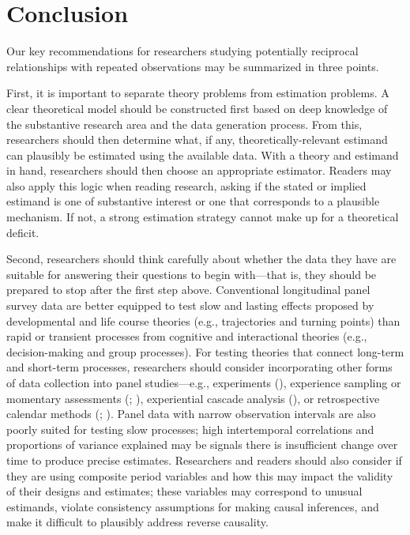 \documentclass[
  letterpaper,
  DIV=11,
  numbers=noendperiod]{scrartcl}
\begin{document}
\section{Conclusion}\label{conclusion}

Our key recommendations for researchers studying potentially reciprocal
relationships with repeated observations may be summarized in three
points.

First, it is important to separate theory problems from estimation
problems. A clear theoretical model should be constructed first based on
deep knowledge of the substantive research area and the data generation
process. From this, researchers should then determine what, if any,
theoretically-relevant estimand can plausibly be estimated using the
available data. With a theory and estimand in hand, researchers should
then choose an appropriate estimator. Readers may also apply this logic
when reading research, asking if the stated or implied estimand is one
of substantive interest or one that corresponds to a plausible
mechanism. If not, a strong estimation strategy cannot make up for a
theoretical deficit.

Second, researchers should think carefully about whether the data they
have are suitable for answering their questions to begin with---that is,
they should be prepared to stop after the first step above. Conventional
longitudinal panel survey data are better equipped to test slow and
lasting effects proposed by developmental and life course theories
(e.g., trajectories and turning points) than rapid or transient
processes from cognitive and interactional theories (e.g.,
decision-making and group processes). For testing theories that connect
long-term and short-term processes, researchers should consider
incorporating other forms of data collection into panel studies---e.g.,
experiments (), experience sampling or momentary assessments
(;
),
experiential cascade analysis (), or
retrospective calendar methods (; ). Panel data with narrow observation intervals are also poorly
suited for testing slow processes; high intertemporal correlations and
proportions of variance explained may be signals there is insufficient
change over time to produce precise estimates. Researchers and readers
should also consider if they are using composite period variables and
how this may impact the validity of their designs and estimates; these
variables may correspond to unusual estimands, violate consistency
assumptions for making causal inferences, and make it difficult to
plausibly address reverse causality.
\end{document}
